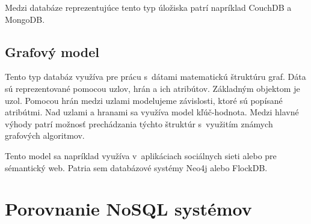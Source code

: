 \documentclass[11pt,twoside,a4paper]{book}
\begin{document}
Medzi databáze reprezentujúce tento typ úložiska patrí napríklad CouchDB a MongoDB.

\subsection{Grafový model}
Tento typ databáz využíva pre prácu s~dátami matematickú štruktúru graf. Dáta sú reprezentované pomocou uzlov, hrán a ich atribútov. Základným objektom je uzol. Pomocou hrán medzi uzlami modelujeme závislosti, ktoré sú popísané atribútmi. Nad uzlami a hranami sa využíva model kľúč-hodnota. Medzi hlavné výhody patrí možnosť prechádzania týchto štruktúr s~využitím známych grafových algoritmov. 

Tento model sa napríklad využíva v~aplikáciach sociálnych sieti alebo pre sémantický web. Patria sem databázové systémy Neo4j alebo FlockDB.


\section{Porovnanie NoSQL systémov}


\end{document}
